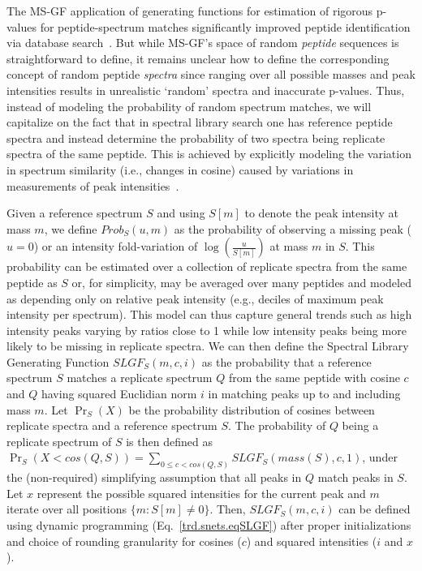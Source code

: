 \documentclass[arial,11pt]{article}
\begin{document}
The MS-GF application of generating functions for estimation of rigorous p-values for peptide-spectrum matches significantly improved peptide identification via database search~\cite{kim08,kim10cidetd,jeong11}. But while MS-GF's space of random {\em peptide} sequences is straightforward to define, it remains unclear how to define the corresponding concept of random peptide {\em spectra} since ranging over all possible masses and peak intensities results in unrealistic `random' spectra and inaccurate p-values. Thus, instead of modeling the probability of random spectrum matches, we will capitalize on the fact that in spectral library search one has reference peptide spectra and instead determine the probability of two spectra being replicate spectra of the same peptide. This is achieved by explicitly modeling the variation in spectrum similarity (i.e., changes in cosine) caused by variations in measurements of peak intensities~\cite{tabb03a,venable04}.

Given a reference spectrum $S$ and using $S[m]$ to denote the peak intensity at mass $m$, we define $Prob_S(u,m)$ as the probability of observing a missing peak ($u=0$) or an intensity fold-variation of $\log(\frac{u}{S[m]})$ at mass $m$ in $S$. This probability can be estimated over a collection of replicate spectra from the same peptide as $S$ or, for simplicity, may be averaged over many peptides and modeled as depending only on relative peak intensity (e.g., deciles of maximum peak intensity per spectrum). This model can thus capture general trends such as high intensity peaks varying by ratios close to 1 while low intensity peaks being more likely to be missing in replicate spectra.
%
We can then define the Spectral Library Generating Function $SLGF_S(m,c,i)$ as the probability that a reference spectrum $S$ matches a replicate spectrum $Q$ from the same peptide with cosine $c$ and $Q$ having squared Euclidian norm $i$ in matching peaks up to and including mass $m$. Let $\Pr_S(X)$ be the probability distribution of cosines between replicate spectra and a reference spectrum $S$. The probability of $Q$ being a replicate spectrum of $S$ is then defined as $\Pr_S(X<cos(Q,S)) = \sum_{0\leq c<cos(Q,S)} SLGF_S(mass(S), c, 1)$, under the (non-required) simplifying assumption that all peaks in $Q$ match peaks in $S$. Let $x$ represent the possible squared intensities for the current peak and $m$ iterate over all positions $\{m:S[m]\neq 0\}$. Then, $SLGF_S(m,c,i)$ can be defined using dynamic programming (Eq.~\ref{trd.snets.eqSLGF}) after proper initializations and choice of rounding granularity for cosines ($c$) and squared intensities ($i$ and $x$).
\end{document}
